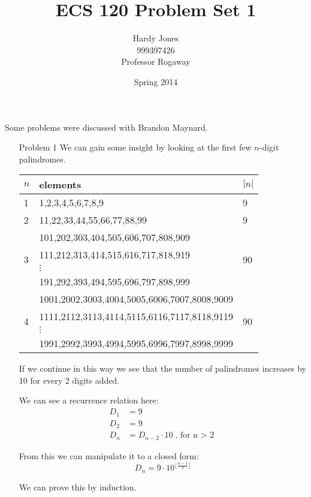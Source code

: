 \documentclass[12pt,letterpaper]{article}
\title{ECS 120 Problem Set 1\vspace{-2ex}}
\author{Hardy Jones\\
        999397426\\
        Professor Rogaway\vspace{-2ex}}
\date{Spring 2014}
\begin{document}
  \maketitle

  Some problems were discussed with Brandon Maynard.

  \begin{enumerate}
    \item[Problem 1]
      We can gain some insight by looking at the first few $n$-digit palindromes.

      \begin{tabular}{l | l | l}
        \multicolumn{1}{l}{$n$} & \multicolumn{1}{l}{elements} & \multicolumn{1}{l}{$|n|$} \\
        \hline
        1 & 1,2,3,4,5,6,7,8,9 & 9 \\
        2 & 11,22,33,44,55,66,77,88,99 & 9 \\
        \multirow{4}{*}{3} & 101,202,303,404,505,606,707,808,909 & \multirow{4}{*}{90} \\
                           & 111,212,313,414,515,616,717,818,919 & \\
                           & $\vdots$ & \\
                           & 191,292,393,494,595,696,797,898,999 & \\
        \multirow{4}{*}{4} & 1001,2002,3003,4004,5005,6006,7007,8008,9009 & \multirow{4}{*}{90} \\
                           & 1111,2112,3113,4114,5115,6116,7117,8118,9119 & \\
                           & $\vdots$ & \\
                           & 1991,2992,3993,4994,5995,6996,7997,8998,9999 &
      \end{tabular}

      If we continue in this way we see that the number of palindromes increases by 10 for every 2 digits added.

      We can see a recurrence relation here:
      \begin{align*}
        D_1 &= 9 \\
        D_2 &= 9 \\
        D_n &= D_{n-2} \cdot 10 \text{, for n $>$ 2}
      \end{align*}

      From this we can manipulate it to a closed form:
      \[D_n = 9 \cdot 10^{\lfloor \frac{n-1}{2} \rfloor}\]

      We can prove this by induction.


\end{enumerate}
\end{document}
